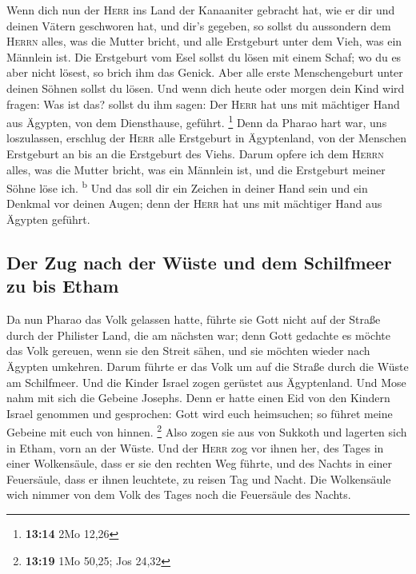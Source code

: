  Wenn dich nun der \textsc{Herr} ins Land der Kanaaniter
gebracht hat, wie er dir und deinen Vätern geschworen hat, und dir's
gegeben,  so sollst du aussondern dem \textsc{Herrn}
alles, was die Mutter bricht, und alle Erstgeburt unter dem Vieh, was
ein Männlein ist.  Die Erstgeburt vom Esel sollst du
lösen mit einem Schaf; wo du es aber nicht lösest, so brich ihm das
Genick. Aber alle erste Menschengeburt unter deinen Söhnen sollst du
lösen.  Und wenn dich heute oder morgen dein Kind wird
fragen: Was ist das? sollst du ihm sagen: Der \textsc{Herr} hat uns mit
mächtiger Hand aus Ägypten, von dem Diensthause, geführt. \footnote{\textbf{13:14}
  2Mo 12,26}  Denn da Pharao hart war, uns loszulassen,
erschlug der \textsc{Herr} alle Erstgeburt in Ägyptenland, von der
Menschen Erstgeburt an bis an die Erstgeburt des Viehs. Darum opfere ich
dem \textsc{Herrn} alles, was die Mutter bricht, was ein Männlein ist,
und die Erstgeburt meiner Söhne löse ich. \textsuperscript{b}
 Und das soll dir ein Zeichen in deiner Hand sein und ein
Denkmal vor deinen Augen; denn der \textsc{Herr} hat uns mit mächtiger
Hand aus Ägypten geführt.

\hypertarget{der-zug-nach-der-wuxfcste-und-dem-schilfmeer-zu-bis-etham}{%
\subsection{Der Zug nach der Wüste und dem Schilfmeer zu bis
Etham}\label{der-zug-nach-der-wuxfcste-und-dem-schilfmeer-zu-bis-etham}}

 Da nun Pharao das Volk gelassen hatte, führte sie Gott
nicht auf der Straße durch der Philister Land, die am nächsten war; denn
Gott gedachte es möchte das Volk gereuen, wenn sie den Streit sähen, und
sie möchten wieder nach Ägypten umkehren.  Darum führte
er das Volk um auf die Straße durch die Wüste am Schilfmeer. Und die
Kinder Israel zogen gerüstet aus Ägyptenland.  Und Mose
nahm mit sich die Gebeine Josephs. Denn er hatte einen Eid von den
Kindern Israel genommen und gesprochen: Gott wird euch heimsuchen; so
führet meine Gebeine mit euch von hinnen. \footnote{\textbf{13:19} 1Mo
  50,25; Jos 24,32}  Also zogen sie aus von Sukkoth und
lagerten sich in Etham, vorn an der Wüste.  Und der
\textsc{Herr} zog vor ihnen her, des Tages in einer Wolkensäule, dass er
sie den rechten Weg führte, und des Nachts in einer Feuersäule, dass er
ihnen leuchtete, zu reisen Tag und Nacht.  Die
Wolkensäule wich nimmer von dem Volk des Tages noch die Feuersäule des
Nachts.

